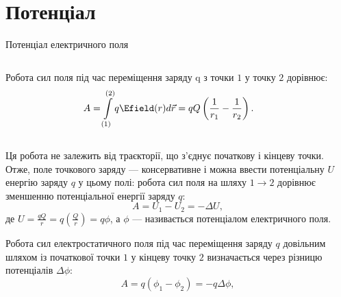 \documentclass{beamer}
\begin{document}
\section{Потенціал}





\begin{frame}{Потенціал електричного поля}{}
	\begin{columns}
		\begin{column}{0.7\linewidth}\justifying
			Робота сил поля під час переміщення заряду q з точки $1$ у точку $2$
			дорівнює:
			\begin{equation*}
				A = \int\limits_{(1)}^{(2)} q\Efield(r) d\vec{r} =
				qQ\left(\frac1{r_1} - \frac1{r_2}\right).
			\end{equation*}

		\end{column}
		\begin{column}{0.3\linewidth}\centering
			
		\end{column}
	\end{columns}
	\begin{overprint}
		\begin{block}{}\justifying\small
			Ця \alert{робота не залежить від траєкторії}, що з'єднує початкову
			і кінцеву точки. Отже, поле точкового заряду ---
			\alert{консервативне} і можна ввести \alert{потенціальну $U$
				енергію} заряду $q$ у цьому полі: робота сил поля на шляху $1 \to
				2$ дорівнює зменшенню потенціальної енергії заряду $q$:
			\begin{equation*}
				A = U_1 - U_2 = - \Delta U,
			\end{equation*}
			де $ U = \frac{qQ}{r} = q \left( \frac{Q}{r} \right)  = q\phi$, а
			$\phi$
			--- називається \alert{потенціалом електричного поля}.
		\end{block}
		\begin{block}{}\justifying\small
			Робота сил електростатичного поля під час переміщення заряду $q$
			довільним шляхом із початкової точки $1$ у кінцеву точку $2$
			визначається через \alert{різницю потенціалів $\Delta\phi$}:
			\begin{equation*}
				A = q(\phi_1 - \phi_2) = - q\Delta\phi,
			\end{equation*}
		\end{block}
	\end{overprint}
\end{frame}
\end{document}

